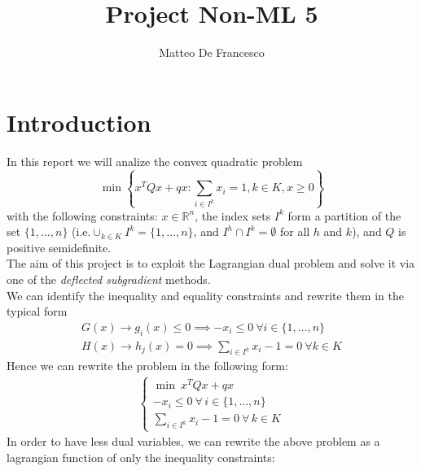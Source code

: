 \documentclass[notitlepage]{article}
\title{Project Non-ML 5}
\author{Matteo De Francesco}
\date{}
\begin{document}
\maketitle

\thispagestyle{empty}

\tableofcontents

\newpage


\section{Introduction}
In this report we will analize the convex quadratic problem
\begin{equation}
    \min \left\lbrace x^T Q x + q x : \sum_{i \in I^k} x_i = 1, k\in K, x \ge 0 \right\rbrace
    \label{eqn:problem} \tag{$P$}
\end{equation}
with the following constraints: $x \in \mathbb{R}^n$, the index sets $I^k$ form a partition of the set $\{1,\ldots,n\}$ (i.e.$ \cup_{k\in K} I^k = \{ 1,\ldots,n \}$, and $I^h \cap I^k = \emptyset $ for all
$h$ and $k$), and $Q$ is positive semidefinite.\\
The aim of this project is to exploit the Lagrangian dual problem and solve it via one of the \textit{deflected subgradient} methods.\\
We can identify the inequality and equality constraints and rewrite them in the typical form
\begin{gather*}
  G(x) \rightarrow g_i(x) \le 0 \implies -x_i \le 0 \ \forall i \in \{1,\ldots,n\} \\
  H(x) \rightarrow h_j(x) = 0 \implies \sum_{i \in I^k} x_i - 1 = 0 \ \forall k \in K
\end{gather*}    
Hence we can rewrite the problem in the following form:
\begin{align*}
  \begin{cases}
    \min\  x^T Q x + q x \\
    -x_i \le 0 \ \forall\, i \in \{1,\ldots,n\} \\
    \sum_{i \in I^k} x_i - 1 = 0 \ \forall\, k \in K
  \end{cases}    
\end{align*}
In order to have less dual variables, we can rewrite the above problem as a lagrangian function of only the inequality constraints:
\end{document}
